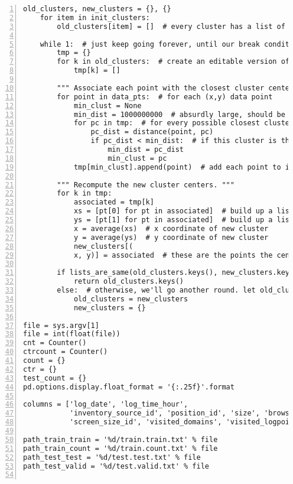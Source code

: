 \begin{lstlisting}[numbers=left, breaklines=true]
    old_clusters, new_clusters = {}, {}
    for item in init_clusters:
        old_clusters[item] = []  # every cluster has a list of points associated with it. Initially, it's 0

    while 1:  # just keep going forever, until our break condition is met
        tmp = {}
        for k in old_clusters:  # create an editable version of the old_clusters dictionary
            tmp[k] = []

        """ Associate each point with the closest cluster center. """
        for point in data_pts:  # for each (x,y) data point
            min_clust = None
            min_dist = 1000000000  # absurdly large, should be larger than the maximum distance for most data sets
            for pc in tmp:  # for every possible closest cluster
                pc_dist = distance(point, pc)
                if pc_dist < min_dist:  # if this cluster is the closest, have it be the closest (duh)
                    min_dist = pc_dist
                    min_clust = pc
            tmp[min_clust].append(point)  # add each point to its closest cluster's list of associated points

        """ Recompute the new cluster centers. """
        for k in tmp:
            associated = tmp[k]
            xs = [pt[0] for pt in associated]  # build up a list of x's
            ys = [pt[1] for pt in associated]  # build up a list of y's
            x = average(xs)  # x coordinate of new cluster
            y = average(ys)  # y coordinate of new cluster
            new_clusters[(
            x, y)] = associated  # these are the points the center was built off of, they're *probably* still associated

        if lists_are_same(old_clusters.keys(), new_clusters.keys()):  # if we've reached equilibrium, return the points
            return old_clusters.keys()
        else:  # otherwise, we'll go another round. let old_clusters = new_clusters, and clear new_clusters.
            old_clusters = new_clusters
            new_clusters = {}

file = sys.argv[1]
file = int(float(file))
cnt = Counter()
ctrcount = Counter()
count = {}
ctr = {}
test_count = {}
pd.options.display.float_format = '{:.25f}'.format

columns = ['log_date', 'log_time_hour',
           'inventory_source_id', 'position_id', 'size', 'browser_id', 'os_id', 'user_agent',
           'screen_size_id', 'visited_domains', 'visited_logpoints', 'clicker', 'click_count']

path_train_train = '%d/train.train.txt' % file
path_train_count = '%d/train.count.txt' % file
path_test_test = '%d/test.test.txt' % file
path_test_valid = '%d/test.valid.txt' % file


\end{lstlisting}
